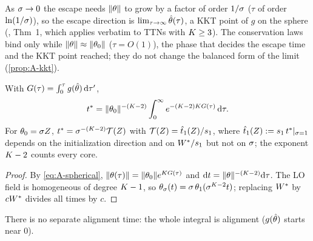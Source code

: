 As $\sigma\to0$ the escape needs $\lVert\theta\rVert$ to grow by a factor of order $1/\sigma$ ($\tau$ of order
$\ln(1/\sigma)$), so the escape direction is $\lim_{\tau\to\infty}\hat{\theta}(\tau)$, a KKT point of $g$ on
the sphere (\citealp{kumar2025early}, Thm~1, which applies verbatim to TTNs with $K\ge3$). The
conservation laws bind only while $\lVert\theta\rVert\approx\lVert\theta_0\rVert$ ($\tau=O(1)$), the phase that
decides the escape time and the KKT point reached; they do not change the balanced form of the
limit (\cref{prop:A-kkt}).

\begin{corollary}\label{cor:A-blowup}
  \proven{} 
  With $G(\tau)=\int_0^\tau g(\hat{\theta})\,\mathrm{d}\tau'$,
  \begin{equation}\label{eq:A-blowup}
    t^*=\lVert\theta_0\rVert^{-(K-2)}\int_0^\infty e^{-(K-2)K G(\tau)}\,\mathrm{d}\tau .
  \end{equation}
  For $\theta_0=\sigma Z$, $t^*=\sigma^{-(K-2)}\mathcal T(Z)$ with $\mathcal T(Z)=\hat t_1(Z)/s_{1}$, where
  $\hat t_1(Z):=s_{1}\,t^*|_{\sigma=1}$ depends on the initialization direction and on $W^{*}/s_{1}$ but not on $\sigma$; the
  exponent $K-2$ counts every core.
\end{corollary}
\begin{proof}
  By \eqref{eq:A-spherical}, $\lVert\theta(\tau)\rVert=\lVert\theta_0\rVert e^{K G(\tau)}$ and
  $\mathrm{d} t=\lVert\theta\rVert^{-(K-2)}\mathrm{d}\tau$. The LO field is homogeneous of degree $K-1$, so
  $\theta_\sigma(t)=\sigma\,\theta_1(\sigma^{K-2}t)$; replacing $W^{*}$ by $cW^{*}$ divides all times by $c$.
\end{proof}
There is no separate alignment time: the whole integral is alignment ($g(\hat{\theta})$ starts near $0$).

